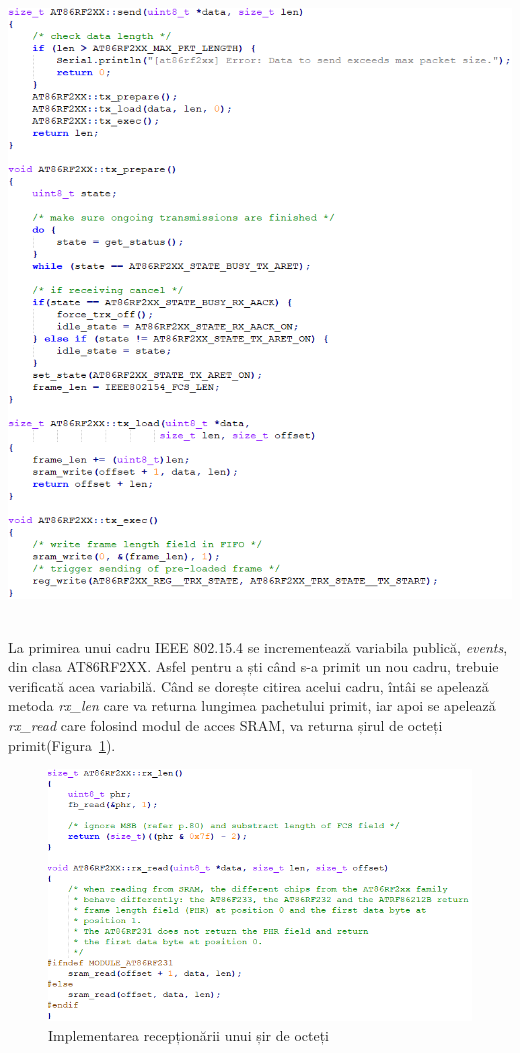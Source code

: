 \documentclass[12pt,a4paper]{report}
\begin{document}
\begin{minipage}[c]{\textwidth}
\centering
\includegraphics[scale=0.68]{pics/send.png}
  \label{fig:send}
\end{minipage}\\

La primirea unui cadru IEEE 802.15.4 se incrementează variabila publică, \textit{events}, din clasa AT86RF2XX. Asfel pentru a ști când s-a primit un nou cadru, trebuie verificată acea variabilă. Când se dorește citirea acelui cadru, întâi se apelează metoda \textit{rx\_len} care va returna lungimea pachetului primit, iar apoi se apelează \textit{rx\_read} care folosind modul de acces SRAM, va returna șirul de octeți primit(Figura~\ref{fig:receive}).\\
\begin{figure}[h]
\centering
\includegraphics[scale=0.68]{pics/receive.png}
  \caption{Implementarea recepționării unui șir de octeți}
  \label{fig:receive}
\end{figure}\\
\end{document}
